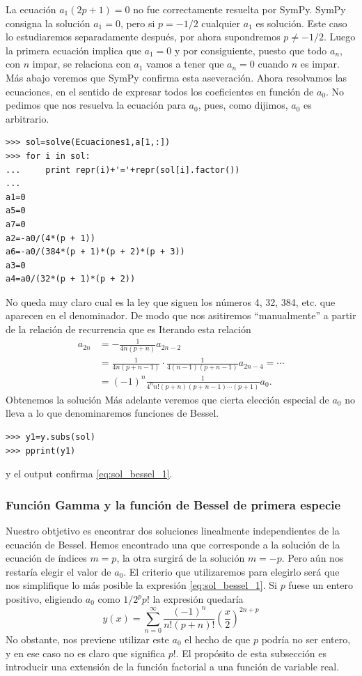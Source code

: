 \documentclass{article}
\begin{document}
 La ecuación $a_1(2p+1)=0$ no fue correctamente resuelta por SymPy. SymPy consigna la solución $a_1=0$, pero si  $p=-1/2$ cualquier $a_1$ es solución. Este caso lo estudiaremos separadamente después, por ahora supondremos $p\neq -1/2$. Luego la primera ecuación implica que $a_1=0$ y por consiguiente, puesto que todo $a_n$, con $n$ impar, se relaciona con $a_1$ vamos a tener que $a_n=0$ cuando $n$ es impar. Más abajo veremos que SymPy confirma esta aseveración. Ahora resolvamos las ecuaciones, en el sentido de expresar todos los coeficientes en función de $a_0$. No pedimos que nos resuelva la ecuación para $a_0$, pues, como dijimos, $a_0$ es arbitrario. 


\begin{lstlisting}
>>> sol=solve(Ecuaciones1,a[1,:])
>>> for i in sol:
...     print repr(i)+'='+repr(sol[i].factor())
... 
a1=0
a5=0
a7=0
a2=-a0/(4*(p + 1))
a6=-a0/(384*(p + 1)*(p + 2)*(p + 3))
a3=0
a4=a0/(32*(p + 1)*(p + 2))

\end{lstlisting}
No queda muy claro cual es la ley que siguen los números 4, 32, 384, etc. que aparecen en el denominador. De modo que nos asitiremos ``manualmente'' a partir de la relación de recurrencia que es
Iterando esta relación
\[
\begin{split}
  a_{2n}&=-\frac{1}{4n(p+n)}a_{2n-2}\\
       &=\frac{1}{4n(p+n-1)}\cdot\frac{1}{4(n-1)(p+n-1)}a_{2n-4}=\cdots\\
       & =(-1)^n\frac{1}{4^nn!(p+n)(p+n-1)\cdots (p+1)}a_{0}.
\end{split}
\]
Obtenemos la solución 
Más adelante veremos que cierta elección especial de $a_0$ no lleva a lo que denominaremos funciones de Bessel.
\begin{lstlisting}
>>> y1=y.subs(sol)
>>> pprint(y1)
\end{lstlisting}
y el output confirma \eqref{eq:sol_bessel_1}.

\subsubsection{Función Gamma y la función de Bessel de primera especie}

Nuestro obtjetivo es encontrar dos soluciones linealmente independientes de la ecuación de Bessel. Hemos encontrado una que corresponde a la solución de la ecuación de índices $m=p$, la otra surgirá de la solución $m=-p$. Pero aún nos restaría elegir el valor de $a_0$. El criterio que utilizaremos para elegirlo será que nos simplifique lo más posible la expresión  \eqref{eq:sol_bessel_1}. Si $p$ fuese un entero positivo, eligiendo $a_0$ como $1/2^pp!$ la expresión quedaría
\[y(x)=\sum_{n=0}^{\infty}\frac{(-1)^n}{n!(p+n)!}\left(\frac{x}{2}\right)^{2n+p}\]
No obstante, nos previene utilizar este $a_0$ el hecho de que $p$ podría no ser entero, y en ese caso no es claro que significa $p!$. El propósito de esta subsección es introducir una extensión de la función factorial a una función de variable real. 
\end{document}
